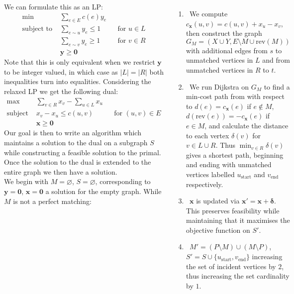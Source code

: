 \documentclass{tikzposter} %
\begin{document}
\begin{columns}
{{      We can formulate this as an LP:
      \begin{align*}
        \min\,\,& \sum_{e \in E} c(e)y_{e} \\
        \text{subject to }& \sum_{e \sim u} y_{e} \le 1 && \text{for $u \in L$} \\
                & \sum_{e \sim v} y_{e} \ge 1 && \text{for $v \in R$} \\
        &\bm{y} \ge \bm{0}
      \end{align*}
      Note that this is only equivalent when we restrict $\bm{y}$ to be integer valued, in which case as $|L| = |R|$ both inequalities turn into equalities. Considering the relaxed LP we get the following dual:
      \begin{align*}
        \max\,\,&\sum_{v \in R} x_{v} - \sum_{u \in L} x_{u} \\
        \text{subject to } &x_{v} - x_{u} \le c(u,v) && \text{for $(u,v) \in E$} \\
        &\bm{x} \ge \bm{0}
      \end{align*}
      Our goal is then to write an algorithm which maintains a solution to the dual on a subgraph $S$ while constructing a feasible solution to the primal. Once the solution to the dual is extended to the entire graph we then have a solution. \\

      We begin with $M = \varnothing$, $S = \varnothing$, corresponding to $\bm{y} = \bm{0}$, $\bm{x} = \bm{0}$ a solution for the empty graph. While $M$ is not a perfect matching: \\

      \begin{enumerate}
              \item \ We compute $c_{\bm{x}}(u,v) = c(u,v)+ x_{u} - x_{v}$, then construct the graph $G_{M} = (X \cup Y, E \setminus M \cup \mathrm{rev}(M))$ with additional edges from $s$ to unmatched vertices in $L$ and from unmatched vertices in $R$ to $t$.
              \item \ We run Dijkstra on $G_{M}$ to find a min-cost path from with respect to $d(e) = c_{\bm{x}}(e)$ if $e \notin M$, $d(\mathrm{rev}(e)) = -c_{\bm{x}}(e)$ if $e \in M$, and calculate the distance to each vertex $\delta(v)$ for $v \in L \cup R$. Thus $\min_{v \in R} \delta(v)$ gives a shortest path, beginning and ending with unmatched vertices labelled $u_{\mathrm{start}}$ and $v_{\mathrm{end}}$ respectively.
              \item \ $\bm{x}$ is updated via $\bm{x'} = \bm{x} + \bm{\delta}$. This preserves feasibility while maintaining that it maximises the objective function on $S'$.
              \item \ $M' = (P \setminus M) \cup (M \setminus P)$, $S' = S \cup \{u_{\mathrm{start}}, v_{\mathrm{end}}\}$ increasing the set of incident vertices by $2$, thus increasing the set cardinality by $1$. \\
      \end{enumerate}

}}
\end{columns}
\end{document}
